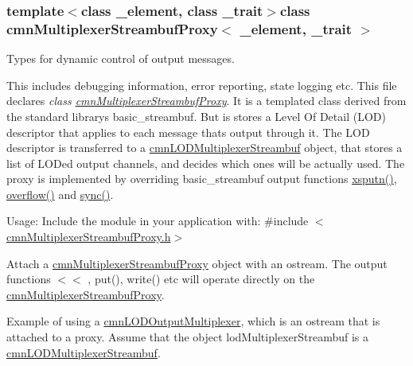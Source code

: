 \subsubsection*{template$<$class \+\_\+element, class \+\_\+trait$>$class cmn\+Multiplexer\+Streambuf\+Proxy$<$ \+\_\+element, \+\_\+trait $>$}

Types for dynamic control of output messages. 

This includes debugging information, error reporting, state logging etc. This file declares {\itshape class \hyperlink{classcmn_multiplexer_streambuf_proxy}{cmn\+Multiplexer\+Streambuf\+Proxy}}. It is a templated class derived from the standard library\textquotesingle{}s basic\+\_\+streambuf. But is stores a Level Of Detail (L\+O\+D) descriptor that applies to each message that\textquotesingle{}s output through it. The L\+O\+D descriptor is transferred to a \hyperlink{classcmn_l_o_d_multiplexer_streambuf}{cmn\+L\+O\+D\+Multiplexer\+Streambuf} object, that stores a list of L\+O\+Ded output channels, and decides which ones will be actually used. The proxy is implemented by overriding basic\+\_\+streambuf output functions \hyperlink{classcmn_multiplexer_streambuf_proxy_a43ad7db2163d7cc48b55be06686d285a}{xsputn()}, \hyperlink{classcmn_multiplexer_streambuf_proxy_a10a4e0b433962e191fcbff9b8238ed99}{overflow()} and \hyperlink{classcmn_multiplexer_streambuf_proxy_a7e7755a46401f3d10e6c1f2100af0a4d}{sync()}.

Usage\+: Include the module in your application with\+: \#include $<$\hyperlink{cmn_multiplexer_streambuf_proxy_8h}{cmn\+Multiplexer\+Streambuf\+Proxy.\+h}$>$

Attach a \hyperlink{classcmn_multiplexer_streambuf_proxy}{cmn\+Multiplexer\+Streambuf\+Proxy} object with an ostream. The output functions $<$$<$ , put(), write() etc will operate directly on the \hyperlink{classcmn_multiplexer_streambuf_proxy}{cmn\+Multiplexer\+Streambuf\+Proxy}.

Example of using a \hyperlink{classcmn_l_o_d_output_multiplexer}{cmn\+L\+O\+D\+Output\+Multiplexer}, which is an ostream that is attached to a proxy. Assume that the object lod\+Multiplexer\+Streambuf is a \hyperlink{classcmn_l_o_d_multiplexer_streambuf}{cmn\+L\+O\+D\+Multiplexer\+Streambuf}.


